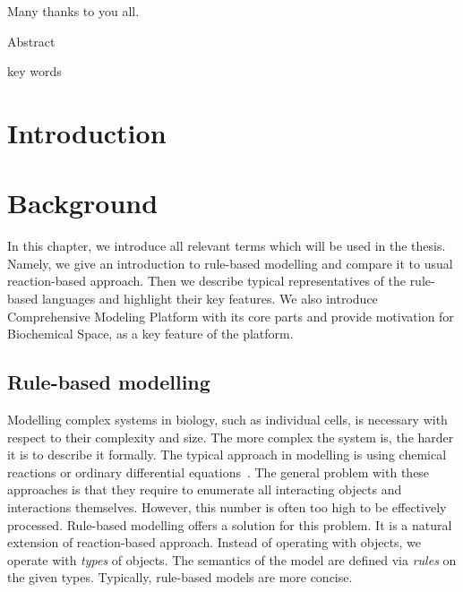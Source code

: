 \documentclass[12pt]{fithesis2}
\begin{document}
\FrontMatter
\ThesisTitlePage

\begin{ThesisDeclaration}
\DeclarationText
\AdvisorName
\end{ThesisDeclaration}

\begin{ThesisThanks}
Many thanks to you all.
\end{ThesisThanks}

\begin{ThesisAbstract}
Abstract
\end{ThesisAbstract}

\begin{ThesisKeyWords}
key words
\end{ThesisKeyWords}

\MainMatter
\tableofcontents

\chapter{Introduction}

\chapter{Background}

In this chapter, we introduce all relevant terms which will be used in the thesis. Namely, we give an introduction to rule-based modelling and compare it to usual reaction-based approach. Then we describe typical representatives of the rule-based languages and highlight their key features. We also introduce Comprehensive Modeling Platform with its core parts and provide motivation for Biochemical Space, as a key feature of the platform.

\section{Rule-based modelling}
\label{Rule-based basics}

Modelling complex systems in biology, such as individual cells, is necessary with respect to their complexity and size. The more complex the system is, the harder it is to describe it formally. The typical approach in modelling is using chemical reactions or ordinary differential equations~\cite{coddington1955theory}. The general problem with these approaches is that they require to enumerate all interacting objects and interactions themselves. However, this number is often too high to be effectively processed. Rule-based modelling offers a solution for this problem. It is a natural extension of reaction-based approach. Instead of operating with objects, we operate with \emph{types} of objects. The semantics of the model are defined via \emph{rules} on the given types. Typically, rule-based models are more concise.
\end{document}
